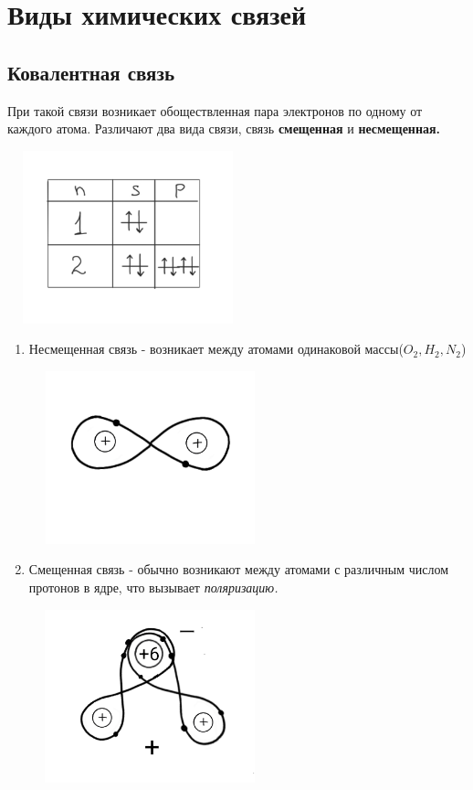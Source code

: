 \documentclass[../main.tex]{subfiles}
\begin{document}
\section{Виды химических связей}

\subsection{Ковалентная связь}

При такой связи возникает обоществленная пара электронов по одному от каждого атома. Различают два вида связи, связь \textbf{смещенная} и \textbf{несмещенная.}
\begin{center}
    \includegraphics[height=5cm, width=7cm]{../img/kvantovy20.png}
\end{center}
\begin{enumerate}
    \item Несмещенная связь - возникает между атомами одинаковой массы($O_2, H_2, N_2$)
    \begin{center}
        \includegraphics[height=5cm, width=7cm]{../img/kvantovy21.png}
    \end{center}
    \item Смещенная связь - обычно возникают между атомами с различным числом протонов в ядре, что вызывает \textit{поляризацию.}
    \begin{center}
        \includegraphics[height=5cm, width=7cm]{../img/kvantovy22.png}
    \end{center}
\end{enumerate}
\end{document}
